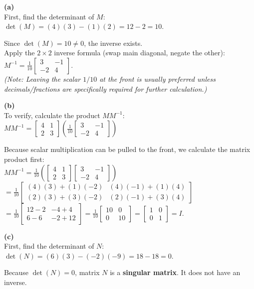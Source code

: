 \begin{solution}
\textbf{(a)} \\
First, find the determinant of $M$: \\
$\det(M) = (4)(3) - (1)(2) = 12 - 2 = 10$.

Since $\det(M) = 10 \neq 0$, the inverse exists. \\
Apply the $2 \times 2$ inverse formula (swap main diagonal, negate the other): \\
$M^{-1} = \frac{1}{10} \begin{bmatrix} 3 & -1 \\ -2 & 4 \end{bmatrix}$. \\
\emph{(Note: Leaving the scalar $1/10$ at the front is usually preferred unless decimals/fractions are specifically required for further calculation.)}

\medskip
\textbf{(b)} \\
To verify, calculate the product $M M^{-1}$: \\
$M M^{-1} = \begin{bmatrix} 4 & 1 \\ 2 & 3 \end{bmatrix} \left( \frac{1}{10} \begin{bmatrix} 3 & -1 \\ -2 & 4 \end{bmatrix} \right)$

Because scalar multiplication can be pulled to the front, we calculate the matrix product first: \\
$M M^{-1} = \frac{1}{10} \left( \begin{bmatrix} 4 & 1 \\ 2 & 3 \end{bmatrix} \begin{bmatrix} 3 & -1 \\ -2 & 4 \end{bmatrix} \right)$ \\[6pt]
$= \frac{1}{10} \begin{bmatrix} (4)(3)+(1)(-2) & (4)(-1)+(1)(4) \\ (2)(3)+(3)(-2) & (2)(-1)+(3)(4) \end{bmatrix}$ \\[6pt]
$= \frac{1}{10} \begin{bmatrix} 12-2 & -4+4 \\ 6-6 & -2+12 \end{bmatrix} = \frac{1}{10} \begin{bmatrix} 10 & 0 \\ 0 & 10 \end{bmatrix} = \begin{bmatrix} 1 & 0 \\ 0 & 1 \end{bmatrix} = I$. \checkmark

\medskip
\textbf{(c)} \\
First, find the determinant of $N$: \\
$\det(N) = (6)(3) - (-2)(-9) = 18 - 18 = 0$.

Because $\det(N) = 0$, matrix $N$ is a \textbf{singular matrix}. It does not have an inverse.
\end{solution}

